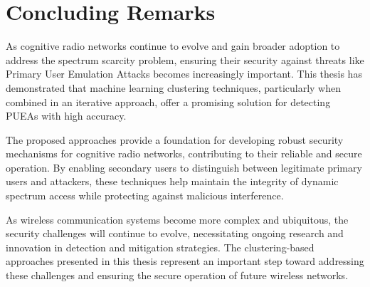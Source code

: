 \section{Concluding Remarks}
As cognitive radio networks continue to evolve and gain broader adoption to address the spectrum scarcity problem, ensuring their security against threats like Primary User Emulation Attacks becomes increasingly important. This thesis has demonstrated that machine learning clustering techniques, particularly when combined in an iterative approach, offer a promising solution for detecting PUEAs with high accuracy.

The proposed approaches provide a foundation for developing robust security mechanisms for cognitive radio networks, contributing to their reliable and secure operation. By enabling secondary users to distinguish between legitimate primary users and attackers, these techniques help maintain the integrity of dynamic spectrum access while protecting against malicious interference.

As wireless communication systems become more complex and ubiquitous, the security challenges will continue to evolve, necessitating ongoing research and innovation in detection and mitigation strategies. The clustering-based approaches presented in this thesis represent an important step toward addressing these challenges and ensuring the secure operation of future wireless networks.

\begin{thebibliography}{99}
\end{thebibliography}
